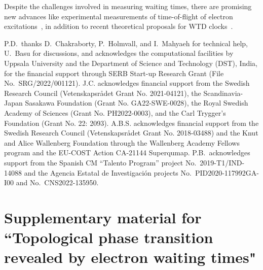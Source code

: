 \documentclass[aps,prl,amsmath,twocolumn,floatfix,superscriptaddress,longbibliography,footinbib]{revtex4-1}
\begin{document}
Despite the challenges involved in measuring waiting times, there are promising new advances like experimental measurements of time-of-flight of electron excitations~\cite{Kataoka2016,Roussely2018}, in addition to recent theoretical proposals for WTD clocks~\cite{Haack2015,Dasenbrook2016}. 


\acknowledgments
P.D.~thanks D.~Chakraborty, P.~Holmvall, and I.~Mahyaeh for technical help, U.~Basu for discussions, and acknowledges the computational facilities by Uppsala University and the Department of Science and Technology (DST), India, for the financial support through SERB Start-up Research Grant (File No.~SRG/2022/001121). 
J.C. acknowledges financial support from the Swedish Research Council (Vetenskapsr{\aa}det Grant No. 2021-04121), the Scandinavia-Japan Sasakawa Foundation (Grant No. GA22-SWE-0028), the Royal Swedish Academy of Sciences (Grant No. PH2022-0003), and the Carl Trygger’s Foundation (Grant No. 22: 2093). 
A.B.S. acknowledges financial support from the Swedish Research Council (Vetenskapsr{\aa}det Grant No. 2018-03488) and the Knut and Alice Wallenberg Foundation through the Wallenberg Academy Fellows program and the EU-COST Action CA-21144 Superqumap. 
P.B.~acknowledges support from the Spanish CM ``Talento Program'' project No.~2019-T1/IND-14088 and the Agencia Estatal de Investigaci\'on projects No.~PID2020-117992GA-I00 and No.~CNS2022-135950. 



%


\clearpage

%
%
\onecolumngrid
%
%
\setcounter{equation}{0}
\renewcommand{\theequation}{S\,\arabic{equation}}
\setcounter{figure}{0}
\renewcommand{\thefigure}{S\,\arabic{figure}}
%
%
\section{Supplementary material for ``Topological phase transition revealed by electron waiting times"}
\end{document}
